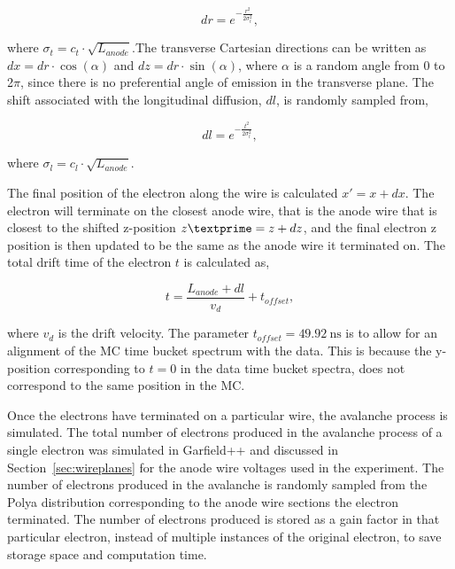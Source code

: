 \begin{equation}
dr = e^{-\frac{r^2}{2\sigma_{t}^2}},
\end{equation}

where $\sigma_{t}=c_{t}\cdot\sqrt{L_{anode}}$.The transverse Cartesian directions can be written as $dx = dr \cdot \cos(\alpha)$ and $dz = dr \cdot \sin(\alpha)$, where $\alpha$ is a random angle from 0 to 2$\pi$, since there is no preferential angle  of emission in the transverse plane. The shift associated with the longitudinal diffusion, $dl$, is randomly sampled from, 

\begin{equation}
dl = e^{-\frac{t^2}{2\sigma_{l}^2}},
\end{equation}

where $\sigma_{l}=c_{l}\cdot\sqrt{L_{anode}}$. 

The final position of the electron along the wire is calculated  $x' = x + dx$. The electron will terminate on the closest anode wire, that is the anode wire that is closest to the shifted z-position $z\textprime = z + dz$, and the final electron z position is then updated to be the same as the anode wire it terminated on. The total drift time of the electron $t$ is calculated as,

\begin{equation}
 t = \frac{L_{anode} + dl}{v_d} + t_{offset},
 \label{eq:electronTime}
\end{equation}
 
where $v_d$ is the drift velocity. The parameter $t_{offset} = \SI{49.92}{\nano\second}$ is to allow for an alignment of the MC time bucket spectrum with the data. This is because the y-position corresponding to $t=0$ in the data time bucket spectra, does not correspond to the same position in the MC.  

Once the electrons have terminated on a particular wire, the avalanche process is simulated. The total number of electrons produced in the avalanche process of a single electron was simulated in Garfield++ and discussed in Section~\ref{sec:wireplanes} for the anode wire voltages used in the experiment. The number of electrons produced in the avalanche is randomly sampled from the Polya distribution  corresponding to the anode wire sections the electron terminated. The number of electrons produced is stored as a gain factor in that particular electron, instead of multiple instances of the original electron, to save storage space and computation time. 


